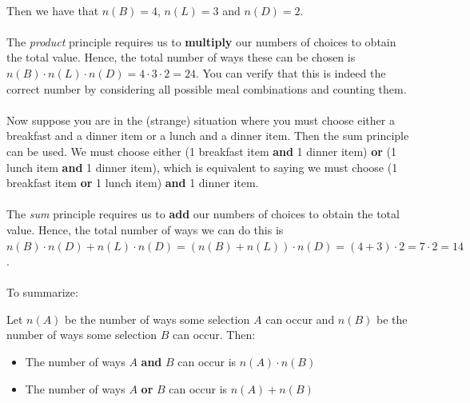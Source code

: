 \documentclass[12pt, a4paper, titlepage, twoside]{article}
\begin{document}
	\paragraph{}
	Then we have that $n(B) = 4$, $n(L) = 3$ and $n(D) = 2$.
	
	\paragraph{}
	The \textit{product} principle requires us to \textbf{multiply} our numbers of choices to obtain the total value.
	Hence, the total number of ways these can be chosen is $n(B) \cdot n(L) \cdot n(D) = 4 \cdot 3 \cdot 2 = 24$.
	You can verify that this is indeed the correct number by considering all possible meal combinations and counting them.
	
	\paragraph{}
	Now suppose you are in the (strange) situation where you must choose either a breakfast and a dinner item or a lunch and a dinner item.
	Then the sum principle can be used. We must choose either (1 breakfast item \textbf{and} 1 dinner item) \textbf{or} (1 lunch 
	item \textbf{and} 1 dinner item), which is equivalent to saying we must choose (1 breakfast item \textbf{or} 1 lunch item) \textbf{and} 1
	dinner item.
	
	\paragraph{}
	The \textit{sum} principle requires us to \textbf{add} our numbers of choices to obtain the total value.
	Hence, the total number of ways we can do this is $n(B) \cdot n(D) + n(L) \cdot n(D) = (n(B) + n(L)) \cdot n(D)
	= (4+3) \cdot 2 = 7 \cdot 2 = 14$.
	
	\paragraph{}
	To summarize:\\
	
	\begin{kp}
		Let $n(A)$ be the number of ways some selection $A$ can occur and $n(B)$ be the number of ways some selection $B$ can
		occur. Then:
		
		\begin{itemize}
			\item The number of ways $A$ \textbf{and} $B$ can occur is $n(A) \cdot n(B)$
			\item The number of ways $A$ \textbf{or} $B$ can occur is $n(A) + n(B)$
		\end{itemize}
	\end{kp}
	
\end{document}
